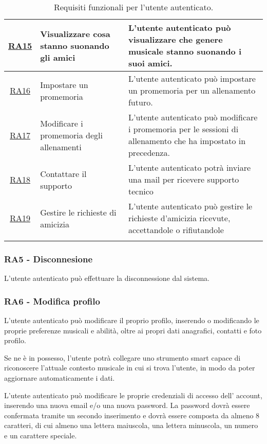\documentclass[12pt, a4paper]{article}
\begin{document}
\begin{longtable}{|c|p{5cm}|p{7cm}|}
    \hline \hyperlink{RA15}{RA15} & Visualizzare cosa stanno suonando gli amici & L'utente autenticato può visualizzare che genere musicale stanno suonando i suoi amici.                             \\ \hline
    \hline \hyperlink{RA16}{RA16} & Impostare un promemoria                     & L'utente autenticato può impostare un promemoria per un allenamento futuro.                                         \\ \hline
    \hline \hyperlink{RA17}{RA17} & Modificare i promemoria degli allenamenti   & L'utente autenticato può modificare i promemoria per le sessioni di allenamento che ha impostato in precedenza.     \\ \hline
    \hline \hyperlink{RA18}{RA18} & Contattare il supporto                      & L'utente autenticato potrà inviare una mail per ricevere supporto tecnico                                           \\ \hline
    \hline \hyperlink{RA19}{RA19} & Gestire le richieste di amicizia            & L'utente autenticato può gestire le richieste d'amicizia ricevute, accettandole o rifiutandole
    \\ \hline
    \caption{Requisiti funzionali per l'utente autenticato.}
\end{longtable}

\subsubsection*{\hypertarget{RA5}{RA5 - Disconnesione}}

L'utente autenticato può effettuare la disconnessione dal sistema.

\subsubsection*{\hypertarget{RA6}{RA6 - Modifica profilo}}
L'utente autenticato può modificare il proprio profilo, inserendo o modificando le proprie preferenze musicali e abilità, oltre ai propri dati anagrafici, contatti e foto profilo.


Se ne è in possesso, l'utente potrà collegare uno strumento smart capace di riconoscere l'attuale contesto musicale in cui si trova l'utente, in modo da poter aggiornare automaticamente i dati.


L'utente autenticato può modificare le proprie credenziali di accesso dell' account, inserendo una nuova email e/o una nuova password. La password dovrà essere confermata tramite un secondo inserimento e dovrà essere composta da almeno 8 caratteri, di cui almeno una lettera maiuscola, una lettera minuscola, un numero e un carattere speciale.
\end{document}

